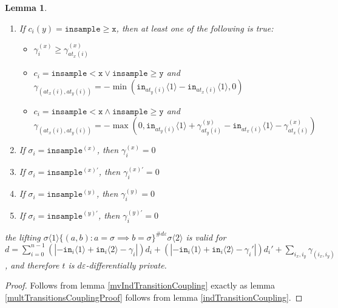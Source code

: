 \documentclass[12pt]{article}
\newcommand{\gguard}[1][x]{\texttt{insample}\geq #1}
\newcommand{\lguard}[1][x]{\texttt{insample} < #1}
\newcommand{\brangle}[1]{\langle #1 \rangle}
\newtheorem{lemma}[thm]{Lemma}
\theoremstyle{definition}
\begin{document}
\begin{lemma}
\begin{enumerate}
\begin{itemize}
            \item $\gamma_i^{(y)}\leq \gamma^{(y)}_{at_y(i)}$
            \item $c_i = \gguard[\texttt{x}]\lor\lguard[\texttt{y}]$ and $\gamma_{(at_x(i), at_y(i))} = -\min(\texttt{in}_{at_x(i)}\brangle{1}-\texttt{in}_{at_y(i)}\brangle{1}, 0)$
            \item $c_i = \gguard[\texttt{x}]\land\lguard[\texttt{y}]$ and $\gamma_{(at_x(i), at_y(i))} = -\max(0, \texttt{in}_{at_x(i)}\brangle{1}+ \gamma_{at_x(i)}^{(x)}-\texttt{in}_{at_y(i)}\brangle{1}-\gamma_{at_y(i)}^{(y)})$
        \end{itemize}
        \item If $c_i(y) = \gguard[\texttt{x}]$, then at least one of the following is true: \begin{itemize}
            \item $\gamma_i^{(x)}\geq \gamma^{(x)}_{at_x(i)}$
            \item $c_i = \lguard[\texttt{x}]\lor\gguard[\texttt{y}]$ and $\gamma_{(at_x(i), at_y(i))} = -\min(\texttt{in}_{at_y(i)}\brangle{1}-\texttt{in}_{at_x(i)}\brangle{1}, 0)$
            \item $c_i = \lguard[\texttt{x}]\land\gguard[\texttt{y}]$ and $\gamma_{(at_x(i), at_y(i))} = -\max(0, \texttt{in}_{at_y(i)}\brangle{1}+ \gamma_{at_y(i)}^{(y)}-\texttt{in}_{at_x(i)}\brangle{1}-\gamma_{at_x(i)}^{(x)})$
        \end{itemize}
        \item If $\sigma_i = \texttt{insample}^{(x)}$, then $\gamma_i^{(x)}=0$
        \item If $\sigma_i = \texttt{insample}^{(x)\prime}$, then $\gamma_i^{(x)\prime}=0$
        \item If $\sigma_i = \texttt{insample}^{(y)}$, then $\gamma_i^{(y)}=0$
        \item If $\sigma_i = \texttt{insample}^{(y)\prime}$, then $\gamma_i^{(y)\prime}=0$
    \end{enumerate}
      the lifting $\sigma\brangle{1}\{(a, b): a=\sigma\implies b=\sigma\}^{\#d\varepsilon}\sigma\brangle{2}$ is valid for $d = \sum_{i=0}^{n-1}(|-\texttt{in}_i\brangle{1}+\texttt{in}_i\brangle{2}-\gamma_i|)d_i+(|-\texttt{in}_i\brangle{1}+\texttt{in}_i\brangle{2}-\gamma_i'|)d_i' + \sum_{i_x, i_y}\gamma_{(i_x, i_y)}$, and therefore $t$ is $d\varepsilon$-differentially private. 
\end{lemma}
\begin{proof}
    Follows from lemma \ref{mvIndTransitionCoupling} exactly as lemma \ref{multTransitionsCouplingProof} follows from lemma \ref{indTransitionCoupling}.
\end{proof}
\end{document}
